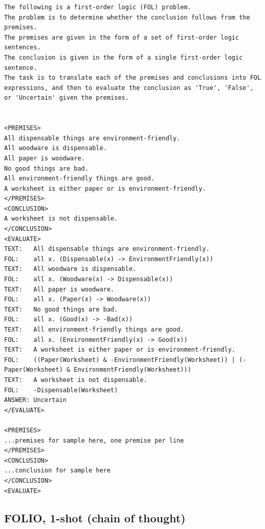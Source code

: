 \begin{lstlisting}[breaklines=true]
The following is a first-order logic (FOL) problem.
The problem is to determine whether the conclusion follows from the premises.
The premises are given in the form of a set of first-order logic sentences.
The conclusion is given in the form of a single first-order logic sentence.
The task is to translate each of the premises and conclusions into FOL expressions, and then to evaluate the conclusion as 'True', 'False', or 'Uncertain' given the premises.


<PREMISES>
All dispensable things are environment-friendly.
All woodware is dispensable.
All paper is woodware.
No good things are bad.
All environment-friendly things are good.
A worksheet is either paper or is environment-friendly.
</PREMISES>
<CONCLUSION>
A worksheet is not dispensable.
</CONCLUSION>
<EVALUATE>
TEXT:	All dispensable things are environment-friendly.
FOL:	all x. (Dispensable(x) -> EnvironmentFriendly(x))
TEXT:	All woodware is dispensable.
FOL:	all x. (Woodware(x) -> Dispensable(x))
TEXT:	All paper is woodware.
FOL:	all x. (Paper(x) -> Woodware(x))
TEXT:	No good things are bad.
FOL:	all x. (Good(x) -> -Bad(x))
TEXT:	All environment-friendly things are good.
FOL:	all x. (EnvironmentFriendly(x) -> Good(x))
TEXT:	A worksheet is either paper or is environment-friendly.
FOL:	((Paper(Worksheet) & -EnvironmentFriendly(Worksheet)) | (-Paper(Worksheet) & EnvironmentFriendly(Worksheet)))
TEXT:	A worksheet is not dispensable.
FOL:	-Dispensable(Worksheet)
ANSWER:	Uncertain
</EVALUATE>

<PREMISES>
...premises for sample here, one premise per line
</PREMISES>
<CONCLUSION>
...conclusion for sample here
</CONCLUSION>
<EVALUATE>
\end{lstlisting}

\subsection{FOLIO, 1-shot (chain of thought)}

